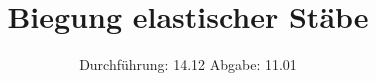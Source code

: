 

\subject{V103}
\title{Biegung elastischer Stäbe}
\date{
  Durchführung: 14.12
  \hspace{3em}
  Abgabe: 11.01
}



\maketitle
\thispagestyle{empty}
\tableofcontents
\newpage








\newpage
\printbibliography{}
\nocite{matplotlib}
\nocite{numpy}
\nocite{uncertainties}
\nocite{reback2020pandas}


